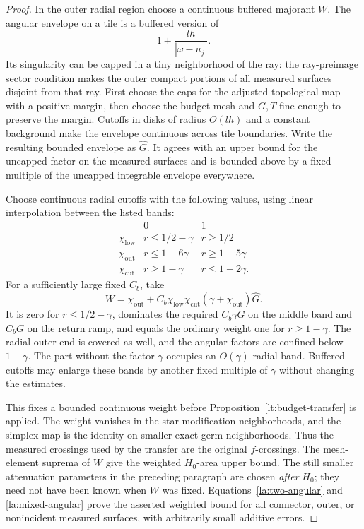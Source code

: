 \documentclass[11pt]{article}
\numberwithin{equation}{section}
\theoremstyle{definition}
\theoremstyle{remark}
\begin{document}
\begin{proof}
In the outer radial region choose a continuous buffered majorant
$W$.  The angular envelope on a tile is a buffered version of
\[
 1+\frac{lh}{|\omega-u_j|}.
\]
Its singularity can be capped in a tiny neighborhood of the ray:
the ray-preimage sector condition makes the outer compact portions
of all measured surfaces disjoint from that ray.  First choose the
caps for the adjusted topological map with a positive margin, then
choose the budget mesh and $G,T$ fine enough to preserve the margin.
Cutoffs in disks of radius $O(lh)$ and a constant background make
the envelope continuous across tile boundaries.  Write the resulting
bounded envelope as $\widehat G$.  It agrees with an upper bound for
the uncapped factor on the measured surfaces and is bounded above
by a fixed multiple of the uncapped integrable envelope everywhere.

Choose continuous radial cutoffs with the following values, using
linear interpolation between the listed bands:
\[
\begin{array}{c|cc}
 &0&1\\ \hline
 \chi_{\mathrm{low}}&r\le1/2-\gamma&r\ge1/2\\
 \chi_{\mathrm{out}}&r\le1-6\gamma&r\ge1-5\gamma\\
 \chi_{\mathrm{cut}}&r\ge1-\gamma&r\le1-2\gamma.
\end{array}
\]
For a sufficiently large fixed $C_b$, take
\begin{equation}\label{la:outer-weight}
 W=\chi_{\mathrm{out}}+
   C_b\chi_{\mathrm{low}}\chi_{\mathrm{cut}}
             (\gamma+\chi_{\mathrm{out}})\widehat G.
\end{equation}
It is zero for $r\le1/2-\gamma$, dominates the required
$C_b\gamma G$ on the middle band and $C_bG$ on the return ramp,
and equals the ordinary weight one for $r\ge1-\gamma$.
The radial outer end is covered as well, and the angular factors
are confined below $1-\gamma$.  The part without the factor $\gamma$ occupies an
$O(\gamma)$ radial band.  Buffered cutoffs may enlarge these bands
by another fixed multiple of $\gamma$ without changing the estimates.

This fixes a bounded continuous weight before
Proposition~\ref{lt:budget-transfer} is applied.  The weight vanishes in
the star-modification neighborhoods, and the simplex map is the
identity on smaller exact-germ neighborhoods.  Thus the measured
crossings used by the transfer are the original $f$-crossings.  The
mesh-element suprema of $W$ give the weighted $H_0$-area upper bound.
The still smaller attenuation parameters in the preceding paragraph
are chosen \emph{after} $H_0$; they need not have been known when $W$
was fixed.  Equations~\eqref{la:two-angular} and
\eqref{la:mixed-angular} prove the asserted weighted bound for all
connector, outer, or nonincident measured surfaces, with arbitrarily
small additive errors.


\end{proof}
\end{document}
